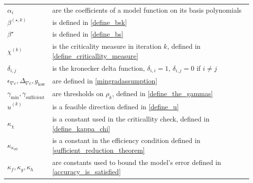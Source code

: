 \documentclass{article}
\theoremstyle{case}
\newcommand{\bs}{{\beta^{\star}}}
\newcommand{\bsk}{{\beta^{(\star, k)}}}
\newcommand{\chik}{{\chi^{(k)}}}
\newcommand{\gammabi}{\gamma_{\text{sufficient}}}
\newcommand{\gammasm}{\gamma_{\text{min}}}
\newcommand{\huk}{{{\hat u}^{(k)}}}
\newcommand{\kappacrit}{{\kappa_{\textrm{eff}}}}
\newcommand{\mingraddelta}{{\Delta_{\nabla c}}}
\newcommand{\mingradepsilon}{{\epsilon_{\nabla c}}}
\newcommand{\mingrad}{{ g_{\text{low}} }}
\newcommand{\rk}{\rho_k}
\begin{document}
\begin{longtable}{| p{} | p{} |}
$\alpha_i$ & are the coefficients of a model function on its basis polynomials \\ %
$\bsk $ & is defined in \cref{define_bsk} \\ %
$\bs $ & is defined in \cref{define_bs} \\ %
$\chik$ & is the criticality measure in iteration $k$, defined in \cref{define_criticallity_measure} \\ %
$\delta_{i,j}$ & is the kronecker delta function, $\delta_{i,i} = 1$, $\delta_{i,j} = 0$ if $i\ne j$ \\ %
$\mingradepsilon, \mingraddelta, \mingrad$ & are defined in \cref{mingradassumption} \\ %
$\gammasm,\gammabi$ & are thresholds on $\rk$, defined in \cref{define_the_gammas} \\ %
$\huk$ & is a feasible direction defined in \cref{define_u} \\ %
$\kappa_{\chi}$ & is a constant used in the criticallity check, defined in \cref{define_kappa_chi} \\ %
$\kappa_{\kappacrit}$ & is a constant in the efficiency condition defined in \cref{sufficient_reduction_theorem} \\ %
$\kappa_{f},\kappa_{g},\kappa_{h}$ & are constants used to bound the model's error defined in \cref{accuracy_is_satisfied} \\ %

\end{longtable}
\end{document}
